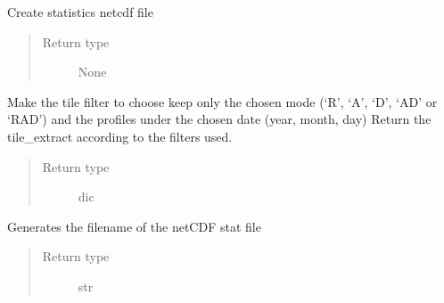 \documentclass[letterpaper,10pt,english]{sphinxmanual}
\begin{document}
\begin{fulllineitems}
\label{\detokenize{pargopy:pargopy.stats.create_stat_file}}
Create statistics netcdf file
\begin{quote}\begin{description}
\item[{Return type}] \leavevmode
None

\end{description}\end{quote}

\end{fulllineitems}


\begin{fulllineitems}
\label{\detokenize{pargopy:pargopy.stats.date_mode_filter}}
Make the tile filter to choose keep only the chosen mode (‘R’, ‘A’, ‘D’, ‘AD’ or ‘RAD’)
and the profiles under the chosen date (year, month, day)
Return the tile\_extract according to the filters used.
\begin{quote}\begin{description}
\item[{Return type}] \leavevmode
dic

\end{description}\end{quote}

\end{fulllineitems}


\begin{fulllineitems}
\label{\detokenize{pargopy:pargopy.stats.generate_filename}}
Generates the filename of the netCDF stat file
\begin{quote}\begin{description}
\item[{Return type}] \leavevmode
str

\end{description}\end{quote}

\end{fulllineitems}
\end{document}

